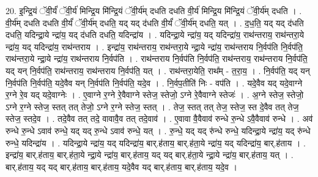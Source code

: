 \documentclass[17pt]{extarticle}
\begin{document}
20. इ॒न्द्रि॒यं ॅवी॒र्यं॑ ॅवी॒र्य॑ मिन्द्रि॒य मि॑न्द्रि॒यं ॅवी॒र्य॑म् दधति दधति वी॒र्य॑ मिन्द्रि॒य मि॑न्द्रि॒यं ॅवी॒र्य॑म् दधति । . वी॒र्य॑म् दधति दधति वी॒र्यं॑ ॅवी॒र्य॑म् दधति॒ यद् यद् द॑धति वी॒र्यं॑ ॅवी॒र्य॑म् दधति॒ यत् । . द॒ध॒ति॒ यद् यद् द॑धति दधति॒ यदिन्द्रा॒ये न्द्रा॑य॒ यद् द॑धति दधति॒ यदिन्द्रा॑य । . यदिन्द्रा॒ये न्द्रा॑य॒ यद् यदिन्द्रा॑य॒ राथ॑न्तराय॒ राथ॑न्तरा॒ये न्द्रा॑य॒ यद् यदिन्द्रा॑य॒ राथ॑न्तराय । . इन्द्रा॑य॒ राथ॑न्तराय॒ राथ॑न्तरा॒ये न्द्रा॒ये न्द्रा॑य॒ राथ॑न्तराय नि॒र्वप॑ति नि॒र्वप॑ति॒ राथ॑न्तरा॒ये न्द्रा॒ये न्द्रा॑य॒ राथ॑न्तराय नि॒र्वप॑ति । . राथ॑न्तराय नि॒र्वप॑ति नि॒र्वप॑ति॒ राथ॑न्तराय॒ राथ॑न्तराय नि॒र्वप॑ति॒ यद् यन् नि॒र्वप॑ति॒ राथ॑न्तराय॒ राथ॑न्तराय नि॒र्वप॑ति॒ यत् । . राथ॑न्तरा॒येति॒ राथ᳚म् - त॒रा॒य॒ । . नि॒र्वप॑ति॒ यद् यन् नि॒र्वप॑ति नि॒र्वप॑ति॒ यदे॒वैव यन् नि॒र्वप॑ति नि॒र्वप॑ति॒ यदे॒व । . नि॒र्वप॒तीति॑ निः - वप॑ति । . यदे॒वैव यद् यदे॒वाग्ने र॒ग्ने रे॒व यद् यदे॒वाग्नेः । . ए॒वाग्ने र॒ग्ने रे॒वैवाग्ने स्तेज॒ स्तेजो॒ ऽग्ने रे॒वैवाग्ने स्तेजः॑ । . अ॒ग्ने स्तेज॒ स्तेजो॒ ऽग्ने र॒ग्ने स्तेज॒ स्तत् तत् तेजो॒ ऽग्ने र॒ग्ने स्तेज॒ स्तत् । . तेज॒ स्तत् तत् तेज॒ स्तेज॒ स्त दे॒वैव तत् तेज॒ स्तेज॒ स्तदे॒व । . तदे॒वैव तत् तदे॒ वावावै॒व तत् तदे॒वाव॑ । . ए॒वावा वै॒वैवाव॑ रुन्धे रु॒न्धे ऽवै॒वैवाव॑ रुन्धे । . अव॑ रुन्धे रु॒न्धे ऽवाव॑ रुन्धे॒ यद् यद् रु॒न्धे ऽवाव॑ रुन्धे॒ यत् । . रु॒न्धे॒ यद् यद् रु॑न्धे रुन्धे॒ यदिन्द्रा॒ये न्द्रा॑य॒ यद् रु॑न्धे रुन्धे॒ यदिन्द्रा॑य । . यदिन्द्रा॒ये न्द्रा॑य॒ यद् यदिन्द्रा॑य॒ बार्.ह॑ताय॒ बार्.ह॑ता॒ये न्द्रा॑य॒ यद् यदिन्द्रा॑य॒ बार्.ह॑ताय । . इन्द्रा॑य॒ बार्.ह॑ताय॒ बार्.ह॑ता॒ये न्द्रा॒ये न्द्रा॑य॒ बार्.ह॑ताय॒ यद् यद् बार्.ह॑ता॒ये न्द्रा॒ये न्द्रा॑य॒ बार्.ह॑ताय॒ यत् । . बार्.ह॑ताय॒ यद् यद् बार्.ह॑ताय॒ बार्.ह॑ताय॒ यदे॒वैव यद् बार्.ह॑ताय॒ बार्.ह॑ताय॒ यदे॒व । \newline
\end{document}
